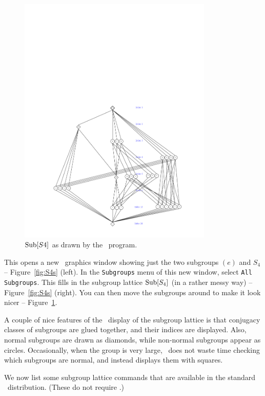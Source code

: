 \begin{figure}[!h]
  \begin{center}
    \vspace{-4cm}
    \includegraphics[height=12cm]{inputs/neatS4.pdf}%
    \caption{$\mathrm{Sub}[S4]$ as drawn by the \xgap\ program.}
    \label{fig:neatS4}
  \end{center}
\end{figure}
This opens a new \xgap\ graphics window showing just the two subgroups $(e)$ and
$S_4$ -- Figure~\ref{fig:S4s} (left).  In
the {\tt Subgroups} menu of this new window, select {\tt All Subgroups}.  This
fills in the subgroup lattice $\mathrm{Sub}[S_4]$ (in a rather messy way) -- Figure~\ref{fig:S4s}
(right).  You can then move the subgroups around to make it look nicer --
Figure~\ref{fig:neatS4}. 

A couple of nice features of the \xgap\ display of the
subgroup lattice is that conjugacy classes of subgroups are glued together, and
their indices are displayed.  Also, normal subgroups are drawn as diamonds, while
non-normal subgroups appear as circles.  Occasionally, when the group is very
large, \xgap\ does not waste time checking which subgroups are normal, and
instead displays them with squares.

We now list some subgroup lattice commands that are available in the standard
\gap\ distribution.  (These do not require \xgap.)

